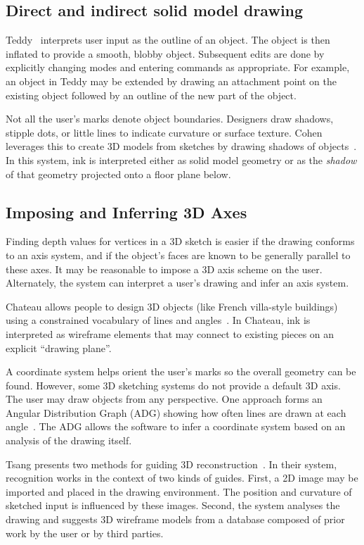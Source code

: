 \subsection{Direct and indirect solid model drawing}

Teddy~\cite{igarashi-teddy} interprets user input as the outline of an
object. The object is then inflated to provide a smooth, blobby
object. Subsequent edits are done by explicitly changing modes and
entering commands as appropriate. For example, an object in Teddy may
be extended by drawing an attachment point on the existing object
followed by an outline of the new part of the object.

Not all the user's marks denote object boundaries. Designers draw
shadows, stipple dots, or little lines to indicate curvature or
surface texture. Cohen leverages this to create 3D models from
sketches by drawing shadows of objects~\cite{cohen-3d}. In this
system, ink is interpreted either as solid model geometry or as
the \textit{shadow} of that geometry projected onto a floor plane
below.

\subsection{Imposing and Inferring 3D Axes}

Finding depth values for vertices in a 3D sketch is easier if the
drawing conforms to an axis system, and if the object's faces are
known to be generally parallel to these axes. It may be reasonable to
impose a 3D axis scheme on the user. Alternately, the system can
interpret a user's drawing and infer an axis system.

Chateau allows people to design 3D objects (like French villa-style
buildings) using a constrained vocabulary of lines and
angles~\cite{igarashi-suggestive}. In Chateau, ink is interpreted as
wireframe elements that may connect to existing pieces on an explicit
``drawing plane''.

A coordinate system helps orient the user's marks so the overall
geometry can be found. However, some 3D sketching systems do not
provide a default 3D axis. The user may draw objects from any
perspective. One approach forms an Angular Distribution Graph (ADG)
showing how often lines are drawn at each
angle~\cite{lipson-correlation,masry-3d-sketch}. The ADG allows the
software to infer a coordinate system based on an analysis of the
drawing itself.

Tsang presents two methods for guiding 3D
reconstruction~\cite{tsang-3d-sketching}. In their system, recognition
works in the context of two kinds of guides. First, a 2D image may be
imported and placed in the drawing environment. The position and
curvature of sketched input is influenced by these images. Second, the
system analyses the drawing and suggests 3D wireframe models from a
database composed of prior work by the user or by third parties.

